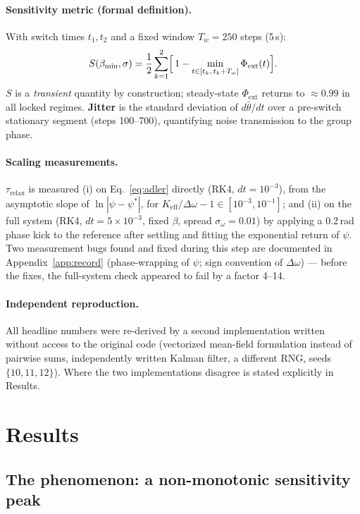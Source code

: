 \documentclass[11pt]{article}
\newcommand{\Keff}{K_{\mathrm{eff}}}
\newcommand{\bmin}{\beta_{\min}}
\newcommand{\dw}{\Delta\omega}
\newcommand{\taurelax}{\tau_{\mathrm{relax}}}
\begin{document}
\paragraph{Sensitivity metric (formal definition).} With switch times
$t_1, t_2$ and a fixed window $T_w = 250$ steps (5\,s):
\begin{equation}\label{eq:metric}
S(\bmin,\sigma) = \frac{1}{2}\sum_{k=1}^{2}
\Bigl[\,1 - \min_{t\in[t_k,\,t_k+T_w]} \Phi_{\mathrm{ext}}(t)\Bigr].
\end{equation}
$S$ is a \emph{transient} quantity by construction; steady-state
$\Phi_{\mathrm{ext}}$ returns to $\approx 0.99$ in all locked regimes.
\textbf{Jitter} is the standard deviation of $d\bar\theta/dt$ over a
pre-switch stationary segment (steps 100--700), quantifying noise transmission
to the group phase.

\paragraph{Scaling measurements.} $\taurelax$ is measured (i) on
Eq.~\eqref{eq:adler} directly (RK4, $dt=10^{-3}$), from the asymptotic slope of
$\ln|\psi-\psi^*|$, for $\Keff/\dw - 1 \in [10^{-3},10^{-1}]$; and (ii) on the
full system (RK4, $dt=5\times10^{-3}$, fixed $\beta$, spread
$\sigma_\omega = 0.01$) by applying a 0.2\,rad phase kick to the reference
after settling and fitting the exponential return of $\psi$. Two measurement
bugs found and fixed during this step are documented in
Appendix~\ref{app:record} (phase-wrapping of $\psi$; sign convention of $\dw$)
--- before the fixes, the full-system check appeared to fail by a factor 4--14.

\paragraph{Independent reproduction.} All headline numbers were re-derived by
a second implementation written without access to the original code
(vectorized mean-field formulation instead of pairwise sums, independently
written Kalman filter, a different RNG, seeds $\{10,11,12\}$). Where the two
implementations disagree is stated explicitly in Results.

\section{Results}\label{sec:results}

\subsection{The phenomenon: a non-monotonic sensitivity peak}
\end{document}

